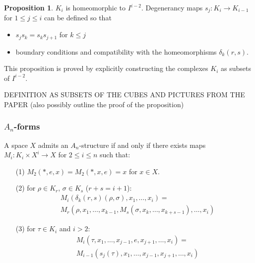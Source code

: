 \documentclass{beamer}
\theoremstyle{definition}
\newtheorem{prop}[teorema]{Proposition}
\begin{document}
\begin{frame}
\begin{prop}
$K_i$ is homeomorphic to $I^{i-2}$. Degenerancy maps $s_j:K_i\to K_{i-1}$ for $1\leq j\leq i$ can be defined so that 
\begin{itemize}
\item $s_js_k=s_ks_{j+1}$ for $k\leq j$
\item boundary conditions and compatibility with the homeomorphisms $\delta_k(r,s)$. 
\end{itemize}
\end{prop}\pause

This proposition is proved by explicitly constructing the complexes $K_i$ as subsets of $I^{i-2}$.
\end{frame}

\begin{frame}
DEFINITION AS SUBSETS OF THE CUBES AND PICTURES FROM THE PAPER (also possibly outline the proof of the proposition)
\end{frame}

\begin{frame}
\frametitle{$A_n$-forms}
\begin{theorem}
A space $X$ admits an $A_n$-structure if and only if there exists maps $M_i:K_i\times X^i\to X$ for $2\leq i\leq n$ such that:
\begin{itemize}
\item[(1)] $M_2(*,e,x)=M_2(*,x,e)=x$ for $x\in X$. %
\item[(2)] for $\rho\in K_r$, $\sigma\in K_s$ ($r+s=i+1$):
\begin{align*}
&M_i(\delta_k(r,s)(\rho,\sigma),x_1,\dots, x_i)=\\
&M_r(\rho,x_1,\dots, x_{k-1},M_s(\sigma,x_k,\dots, x_{k+s-1}),\dots, x_i)
\end{align*} %
\item[(3)] for $\tau\in K_i$ and $i>2$:
\begin{align*}
&M_i(\tau,x_1,\dots, x_{j-1},e,x_{j+1},\dots, x_i)=\\
&M_{i-1}(s_j(\tau),x_1,\dots, x_{j-1},x_{j+1},\dots, x_i)
\end{align*}%
\end{itemize}
\end{theorem}
\end{frame}
\end{document}
